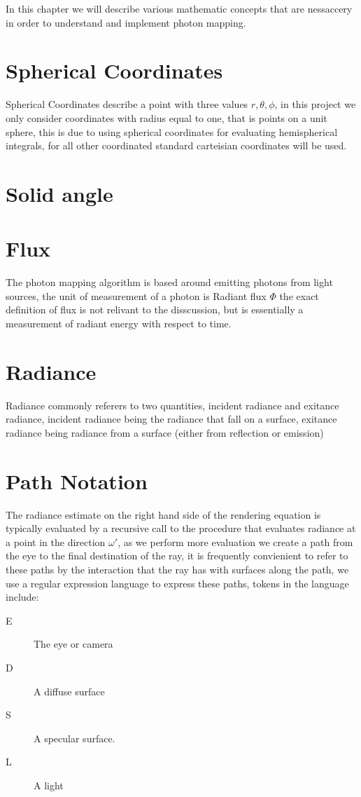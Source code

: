 In this chapter we will describe various mathematic concepts that are nessaccery in order to understand and implement photon mapping.

\section{Spherical Coordinates}
Spherical Coordinates describe a point with three values $r, \theta, \phi$, in this project we only consider coordinates with
radius equal to one, that is points on a unit sphere, this is due to using spherical coordinates for evaluating hemispherical
integrals, for all other coordinated standard carteisian coordinates will be used.


\section{Solid angle}

\section{Flux}
The photon mapping algorithm is based around emitting photons from light sources, the unit of measurement of a photon is
Radiant flux $\Phi$ the exact definition of flux is not relivant to the disscussion, but is essentially a measurement
of radiant energy with respect to time. 

\section{Radiance}
Radiance commonly referers to two quantities, incident radiance and exitance radiance, incident radiance being the radiance
that fall on a surface, exitance radiance being radiance from a surface (either from reflection or emission)

\section{Path Notation}
The radiance estimate on the right hand side of the rendering equation is typically evaluated by a recursive call to the
procedure that evaluates radiance at a point in the direction $\omega'$, as we perform more evaluation we create a path
from the eye to the final destination of the ray, it is frequently convienient to refer to these paths by the interaction
that the ray has with surfaces along the path, we use a regular expression language to express these paths, tokens in the
language include:
\begin{description}
\item[E] The eye or camera
\item[D] A diffuse surface
\item[S] A specular surface.
\item[L] A light
\end{description}

